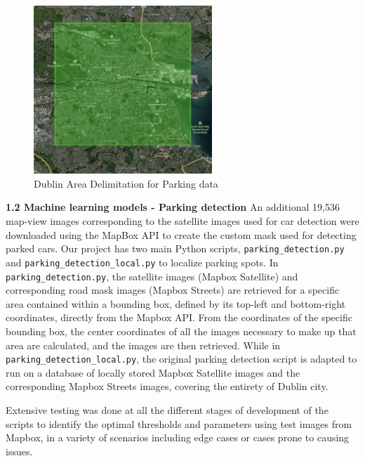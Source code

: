 \begin{figure}[htbp]
    \centering
    \includegraphics[width=0.6\textwidth]{images/dublin-img-area.jpg}
    \caption{Dublin Area Delimitation for Parking data}
\end{figure}

\textbf{1.2 Machine learning models - Parking detection}
An additional 19,536 map-view images corresponding to the satellite images used
for car detection were downloaded using the MapBox API to create the custom mask
used for detecting parked cars. Our project has two main Python scripts,
\texttt{parking\_detection.py} and \texttt{parking\_detection\_local.py} to
localize parking spots. In \texttt{parking\_detection.py}, the satellite images
(Mapbox Satellite) and corresponding road mask images (Mapbox Streets) are
retrieved for a specific area contained within a bounding box, defined by its
top-left and bottom-right coordinates, directly from the Mapbox API. From the
coordinates of the specific bounding box, the center coordinates of all the
images necessary to make up that area are calculated, and the images are then
retrieved. While in \texttt{parking\_detection\_local.py}, the original parking
detection script is adapted to run on a database of locally stored Mapbox
Satellite images and the corresponding Mapbox Streets images, covering the
entirety of Dublin city. 

Extensive testing was done at all the different stages of development of the
scripts to identify the optimal thresholds and parameters using test images from
Mapbox, in a variety of scenarios including edge cases or cases prone to causing
issues.

\newpage{}

